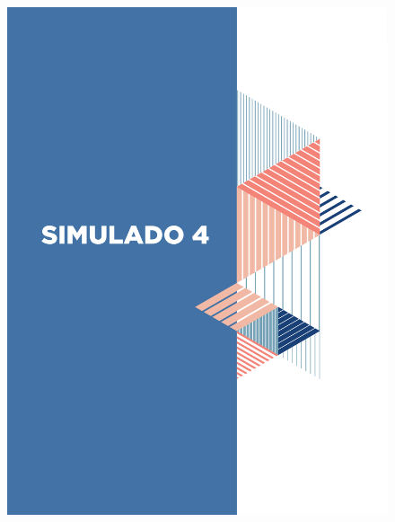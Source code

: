 \begin{figure}[htpb!]
\vspace*{-3cm}
\hspace*{-2.5cm}\includegraphics[scale=1]{../watermarks/4simulado9ano.pdf}
\end{figure}


%

